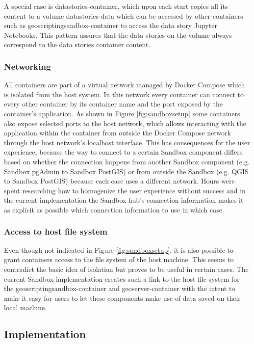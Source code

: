 \documentclass[11pt, a4paper, oneside, parskip=full-]{scrartcl}
\begin{document}
A special case is datastories-container, which upon each start copies all its
content to a volume datastories-data which can be accessed by other containers
such as geoscriptingsandbox-container to access the data story Jupyter
Notebooks. This pattern assures that the data stories on the volume always
correspond to the data stories container content.

\subsubsection*{Networking}
All containers are part of a virtual network managed by Docker Compose which is
isolated from the host system. In this network every container can connect to
every other container by its container name and the port exposed by the
container's application. As shown in Figure \ref{fig:sandboxsetup} some
containers also expose selected ports to the host network, which allows
interacting with the application within the container from outside the Docker
Compose network through the host network's localhost interface. This has
consequences for the user experience, because the way to connect to a certain
Sandbox component differs based on whether the connection happens from another
Sandbox component (e.g. Sandbox pgAdmin to Sandbox PostGIS) or from outside the
Sandbox (e.g. QGIS to Sandbox PostGIS) because each case uses a different
network. Hours were spent researching how to homogenize the user experience
without success and in the current implementation the Sandbox hub's connection
information makes it as explicit as possible which connection information to use
in which case.

\subsubsection*{Access to host file system}
Even though not indicated in Figure \ref{fig:sandboxsetup}, it is also possible
to grant containers access to the file system of the host machine. This seems to
contradict the basic idea of isolation but proves to be useful in certain cases.
The current Sandbox implementation creates such a link to the host file system
for the geoscriptingsandbox-container and geoserver-container with the intent to
make it easy for users to let these components make use of data saved on their
local machine.

\subsection{Implementation}
\end{document}
